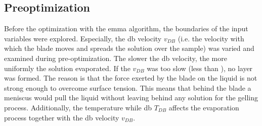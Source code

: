\subsection{Preoptimization}
Before the optimization with the \gls{emma} algorithm, 
the boundaries of the input variables were explored. 
Especially, the \gls{db} velocity $v_{DB}$ (i.e. the velocity with which the blade moves and spreads the solution over the sample)
was varied and examined during pre-optimization. 
The slower the \gls{db} velocity, the more uniformly the solution evaporated. 
If the $v_{DB}$ was too slow (less than ), no layer was formed. 
The reason is that the force exerted by the blade on the liquid is not strong enough to overcome surface tension. 
This means that behind the blade a meniscus would pull the liquid without leaving behind any solution for the gelling process. 
Additionally, the temperature while \gls{db} $T_{DB}$ affects the evaporation process together with the \gls{db} velocity $v_{DB}$. 





